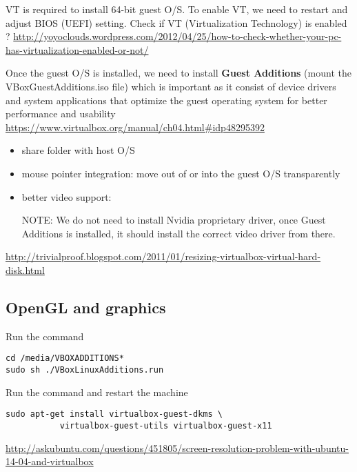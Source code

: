 VT is required to install 64-bit guest O/S. To enable VT, we need to restart and
adjust BIOS (UEFI) setting. Check if VT (Virtualization Technology) is enabled ?
\url{http://yoyoclouds.wordpress.com/2012/04/25/how-to-check-whether-your-pc-has-virtualization-enabled-or-not/}


Once the guest O/S is installed, we need to install {\bf Guest Additions}
(mount the VBoxGuestAdditions.iso file) which is important  as it consist of
device drivers and system applications that optimize the guest operating system for better performance and usability
\url{https://www.virtualbox.org/manual/ch04.html\#idp48295392}
\begin{itemize}
  \item share folder with host O/S
  
  \item mouse pointer integration: move out of or into the guest O/S
  transparently
  
  \item better video support: 
  
  NOTE: We do not need to install Nvidia proprietary driver, once Guest
  Additions is installed, it should install the correct video driver from
  there.
  
\end{itemize}

\url{http://trivialproof.blogspot.com/2011/01/resizing-virtualbox-virtual-hard-disk.html}

\subsection{OpenGL and graphics}

Run the command
\begin{verbatim}
cd /media/VBOXADDITIONS*
sudo sh ./VBoxLinuxAdditions.run
\end{verbatim}

Run the command and restart the machine
\begin{verbatim}
sudo apt-get install virtualbox-guest-dkms \
           virtualbox-guest-utils virtualbox-guest-x11
\end{verbatim}
\url{http://askubuntu.com/questions/451805/screen-resolution-problem-with-ubuntu-14-04-and-virtualbox}

